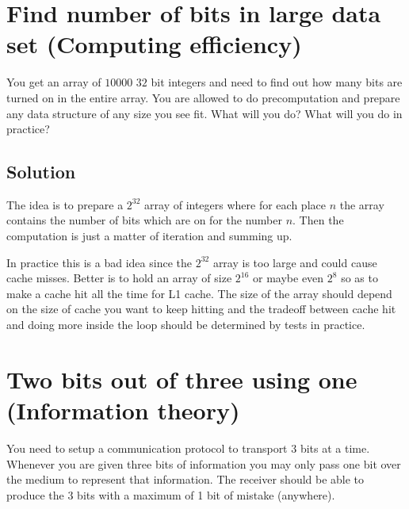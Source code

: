 \documentclass{article}
\begin{document}
\section {Find number of bits in large data set (Computing efficiency)}
You get an array of $10000$ $32$ bit integers and need to find out how many bits are turned on in the entire array.
You are allowed to do precomputation and prepare any data structure of any size you see fit. What will you do? What will you do in practice?

\subsection{Solution}
The idea is to prepare a $2^{32}$ array of integers where for each place $n$ the array contains the number of bits which are on for the number $n$. Then the computation is just a matter of iteration and summing up.

In practice this is a bad idea since the $2^{32}$ array is too large and could cause cache misses. Better is to hold an array of size $2^{16}$ or maybe even $2^{8}$ so as to make a cache hit all the time for L1 cache. The size of the array should depend on the size of cache you want to keep hitting and the tradeoff between cache hit and doing more inside the loop should be determined by tests in practice.

\section {Two bits out of three using one (Information theory)}
You need to setup a communication protocol to transport $3$ bits at a time. Whenever you are given three bits of information you may only pass one bit over the medium to represent that information. The receiver should be able to produce the $3$ bits with a maximum of 1 bit of mistake (anywhere).
\end{document}
